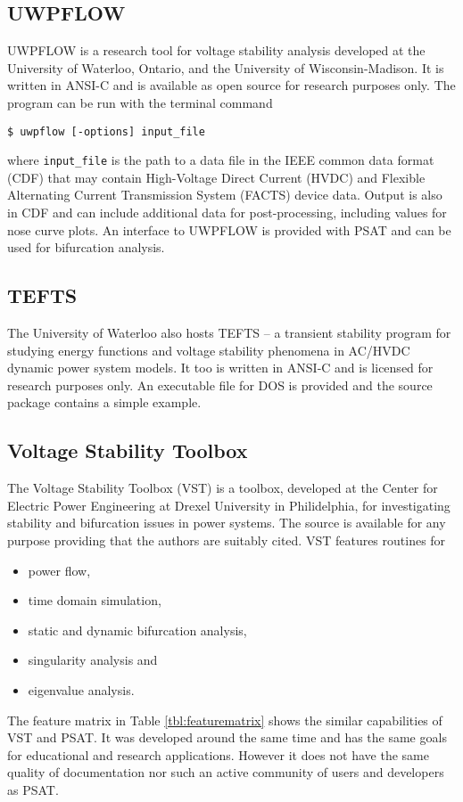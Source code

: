 \subsection{UWPFLOW}
UWPFLOW is a research tool for voltage stability analysis developed at the
University of Waterloo, Ontario, and the University of Wisconsin-Madison.  It
is written in ANSI-C and is available as open source for research purposes
only. The program can be run with the terminal command
\begin{center}
\begin{verbatim}
$ uwpflow [-options] input_file
\end{verbatim}
\end{center}
where \texttt{input\_file} is the path to a data file in the IEEE common data
format (CDF) \cite{cdf:73} that may contain High-Voltage Direct Current (HVDC)
and Flexible Alternating Current Transmission System (FACTS) device data.
Output is also in CDF and can include additional data for post-processing,
including values for nose curve plots.  An interface to UWPFLOW is provided
with PSAT and can be used for bifurcation analysis.

\subsection{TEFTS}
The University of Waterloo also hosts TEFTS -- a transient stability program
for studying energy functions and voltage stability phenomena in AC/HVDC
dynamic power system models.  It too is written in ANSI-C and is licensed for
research purposes only.  An executable file for DOS is provided and the source
package contains a simple example.

\subsection{Voltage Stability Toolbox}
The Voltage Stability Toolbox (VST) is a \matlab toolbox, developed at the
Center for Electric Power Engineering at Drexel University in Philidelphia, for
investigating stability and bifurcation issues in power systems.  The source
is available for any purpose providing that the authors are suitably cited.
VST features routines for
\begin{itemize}
  \item power flow,
  \item time domain simulation,
  \item static and dynamic bifurcation analysis,
  \item singularity analysis and
  \item eigenvalue analysis.
\end{itemize}
The feature matrix in Table \ref{tbl:featurematrix} shows the similar
capabilities of VST and PSAT. It was developed around the same time and has
the same goals for educational and research applications.  However it does not
have the same quality of documentation nor such an active community of users
and developers as PSAT.


